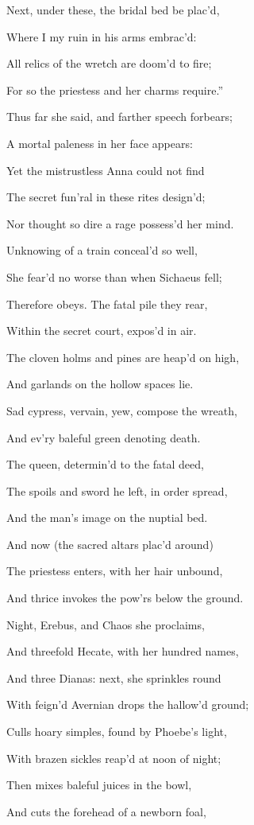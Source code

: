 Next, under these, the bridal bed be plac’d,

Where I my ruin in his arms embrac’d:

All relics of the wretch are doom’d to fire;

For so the priestess and her charms require.”

Thus far she said, and farther speech forbears;

A mortal paleness in her face appears:

Yet the mistrustless Anna could not find

The secret fun’ral in these rites design’d;

Nor thought so dire a rage possess’d her mind.

Unknowing of a train conceal’d so well,

She fear’d no worse than when Sichaeus fell;

Therefore obeys. The fatal pile they rear,

Within the secret court, expos’d in air.

The cloven holms and pines are heap’d on high,

And garlands on the hollow spaces lie.

Sad cypress, vervain, yew, compose the wreath,

And ev’ry baleful green denoting death.

The queen, determin’d to the fatal deed,

The spoils and sword he left, in order spread,

And the man’s image on the nuptial bed.

And now (the sacred altars plac’d around)

The priestess enters, with her hair unbound,

And thrice invokes the pow’rs below the ground.

Night, Erebus, and Chaos she proclaims,

And threefold Hecate, with her hundred names,

And three Dianas: next, she sprinkles round

With feign’d Avernian drops the hallow’d ground;

Culls hoary simples, found by Phoebe’s light,

With brazen sickles reap’d at noon of night;

Then mixes baleful juices in the bowl,

And cuts the forehead of a newborn foal,

